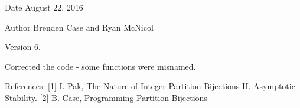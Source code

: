 \begin{DoxyDate}{Date}
August 22, 2016 
\end{DoxyDate}
\begin{DoxyAuthor}{Author}
Brenden Case and Ryan Mc\+Nicol 
\end{DoxyAuthor}
\begin{DoxyVersion}{Version}
6.
\end{DoxyVersion}
Corrected the code -\/ some functions were misnamed.

References\+: \mbox{[}1\mbox{]} I. Pak, The Nature of Integer Partition Bijections II. Asymptotic Stability. \mbox{[}2\mbox{]} B. Case, Programming Partition Bijections 